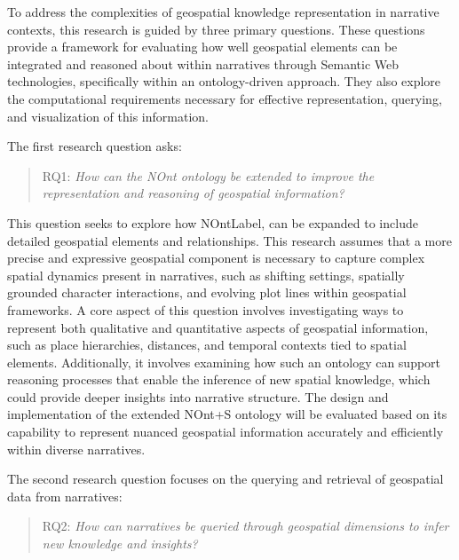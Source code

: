 To address the complexities of geospatial knowledge representation in narrative contexts, this research is guided by three primary questions. These questions provide a framework for evaluating how well geospatial elements can be integrated and reasoned about within narratives through Semantic Web technologies, specifically within an ontology-driven approach. They also explore the computational requirements necessary for effective representation, querying, and visualization of this information. 

The first research question asks:

\begin{quote}\label{quote:rq1}
RQ1: \emph{How can the NOnt ontology be extended to improve the representation and reasoning of geospatial information?}
\end{quote}

This question seeks to explore how \acrshort{NOntLabel}\cite{meghiniRepresentingNarrativesDigital2021}, can be expanded to include detailed geospatial elements and relationships. This research assumes that a more precise and expressive geospatial component is necessary to capture complex spatial dynamics present in narratives, such as shifting settings, spatially grounded character interactions, and evolving plot lines within geospatial frameworks. A core aspect of this question involves investigating ways to represent both qualitative and quantitative aspects of geospatial information, such as place hierarchies, distances, and temporal contexts tied to spatial elements. Additionally, it involves examining how such an ontology can support reasoning processes that enable the inference of new spatial knowledge, which could provide deeper insights into narrative structure. The design and implementation of the extended NOnt+S ontology will be evaluated based on its capability to represent nuanced geospatial information accurately and efficiently within diverse narratives.

The second research question focuses on the querying and retrieval of geospatial data from narratives:

\begin{quote}\label{quote:rq2}
RQ2: \emph{How can narratives be queried through geospatial dimensions to infer new knowledge and insights?}
\end{quote}

